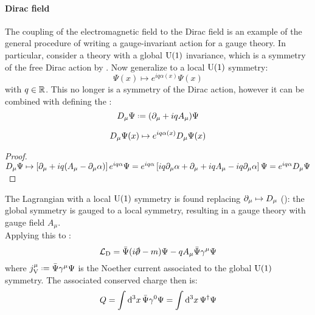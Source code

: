 \paragraph{Dirac field}

The coupling of the electromagnetic field to the Dirac field is an example of the general procedure of writing a gauge-invariant action for a gauge theory. In particular, consider a theory with a global $ \mathrm{U}(1) $ invariance, which is a symmetry of the free Dirac action by . Now generalize to a local $ \mathrm{U}(1) $ symmetry:
\begin{equation}
  \Psi(x) \mapsto e^{iq \alpha(x)} \Psi(x)
  \label{eq:qed-dir-inv}
\end{equation}
with $ q \in \mathbb{R} $. This no longer is a symmetry of the Dirac action, however it can be combined with  defining the :
\begin{equation}
  \covder_\mu \Psi \defeq (\pa_\mu + i q A_\mu) \Psi
\end{equation}

\begin{proposition}[before upper = {\tcbtitle}]{}{}
  \begin{equation}
    D_\mu \Psi(x) \mapsto e^{i q \alpha(x)} D_\mu \Psi(x)
    \label{eq:qed-cov-der}
  \end{equation}
\end{proposition}

\begin{proofbox}
  \begin{proof}
      $ D_\mu \Psi \mapsto \left[ \partial_\mu + i q (A_\mu - \partial_\mu \alpha) \right] e^{i q \alpha} \Psi = e^{i q \alpha} \left[ i q \partial_\mu \alpha + \partial_\mu + i q A_\mu - i q \partial_\mu \alpha \right] \Psi = e^{i q \alpha} D_\mu \Psi $
  \end{proof}
\end{proofbox}

The Lagrangian with a local $ \mathrm{U}(1) $ symmetry is found replacing $ \partial_\mu \mapsto D_\mu $ (): the global symmetry is gauged to a local symmetry, resulting in a gauge theory with gauge field $ A_\mu $. \\
Applying this to :
\begin{equation}
  \lag_\text{D} = \bar{\Psi} (i \slashed{\pa} - m) \Psi - q A_\mu \bar{\Psi} \gamma^\mu \Psi
\end{equation}
where $ j_\text{V}^\mu \defeq \bar{\Psi} \gamma^\mu \Psi $ is the Noether current associated to the global $ \mathrm{U}(1) $ symmetry. The associated conserved charge then is:
\begin{equation}
  Q = \int \mathrm{d}^3x\, \bar{\Psi} \gamma^0 \Psi = \int \mathrm{d}^3x\, \Psi^\dagger \Psi
\end{equation}

